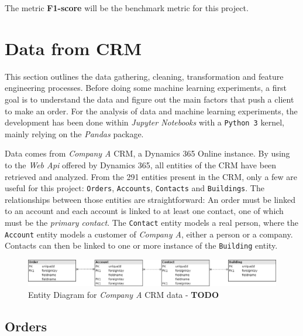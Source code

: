 The metric \textbf{F1-score} will be the benchmark metric for this project.

\section{Data from CRM} \label{sec:crm-data}

This section outlines the data gathering, cleaning, transformation and feature engineering processes. Before doing some machine learning experiments, a first goal is to understand the data and figure out the main factors that push a client to make an order. For the analysis of data and machine learning experiments, the development has been done within \textit{Jupyter Notebooks} with a \texttt{Python 3} kernel, mainly relying on the \textit{Pandas} package.

Data comes from \textit{Company A} CRM, a Dynamics 365 Online instance. By using to the \textit{Web Api} offered by Dynamics 365, all entities of the CRM have been retrieved and analyzed. From the 291 entities present in the CRM, only a few are useful for this project: \texttt{Orders}, \texttt{Accounts}, \texttt{Contacts} and \texttt{Buildings}. The relationships between those entities are straightforward: An order must be linked to an account and each account is linked to at least one contact, one of which must be the \textit{primary contact}. The \texttt{Contact} entity models a real person, where the \texttt{Account} entity models a customer of \textit{Company A}, either a person or a company. Contacts can then be linked to one or more instance of the \texttt{Building} entity.

\begin{figure}[h]
    \centering
    \includegraphics[width=15cm]{images/entityDiagram.png}
    \caption{Entity Diagram for \textit{Company A} CRM data - \textbf{TODO}}
    \label{fig:entity-diagram}
\end{figure}

\subsection{Orders}\label{sec:crm-orders}

